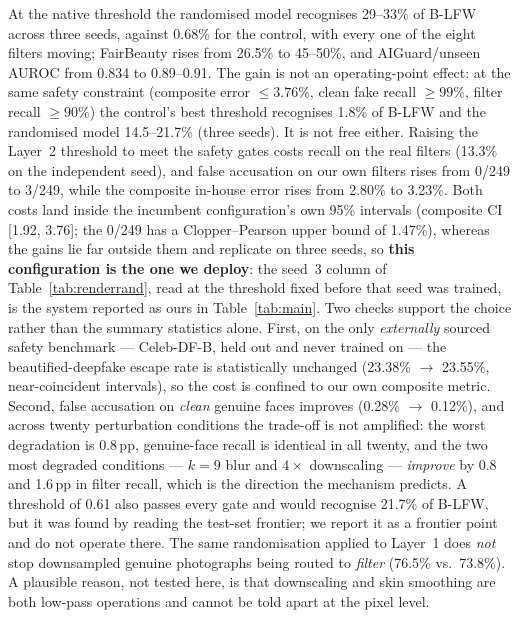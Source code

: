 \documentclass[conference]{IEEEtran}
\begin{document}
At the native threshold the randomised model recognises 29--33\% of B-LFW across three seeds, against
0.68\% for the control, with every one of the eight filters moving; FairBeauty rises from 26.5\% to
45--50\%, and AIGuard/unseen AUROC from 0.834 to 0.89--0.91. The gain is not an operating-point effect: at
the same safety constraint (composite error $\le 3.76\%$, clean fake recall $\ge 99\%$, filter recall
$\ge 90\%$) the control's best threshold recognises 1.8\% of B-LFW and the randomised model 14.5--21.7\% (three seeds).
It is not free either. Raising the Layer~2 threshold to meet the safety gates costs recall on the real
filters (13.3\% on the independent seed), and false accusation on our own filters rises from 0/249 to
3/249, while the composite in-house error rises from 2.80\% to 3.23\%. Both costs land inside the
incumbent configuration's own 95\% intervals (composite CI [1.92, 3.76]; the 0/249 has a
Clopper--Pearson upper bound of 1.47\%), whereas the gains lie far outside them and replicate on three
seeds, so \textbf{this configuration is the one we deploy}: the seed~3 column of
Table~\ref{tab:renderrand}, read at the threshold fixed before that seed was trained, is the system
reported as ours in Table~\ref{tab:main}. Two checks support the choice rather than the summary
statistics alone. First, on the only \emph{externally} sourced safety benchmark --- Celeb-DF-B, held
out and never trained on --- the beautified-deepfake escape rate is statistically unchanged
(23.38\% $\to$ 23.55\%, near-coincident intervals), so the cost is confined to our own composite
metric. Second, false accusation on \emph{clean} genuine faces improves (0.28\% $\to$ 0.12\%), and
across twenty perturbation conditions the trade-off is not amplified: the worst degradation is
0.8\,pp, genuine-face recall is identical in all twenty, and the two most degraded conditions ---
$k{=}9$ blur and $4\times$ downscaling --- \emph{improve} by 0.8 and 1.6\,pp in filter recall, which is
the direction the mechanism predicts.
A threshold of 0.61 also passes every gate and would recognise 21.7\% of B-LFW, but it was found by
reading the test-set frontier; we report it as a frontier point and do not operate there. The same randomisation applied to Layer~1 does \emph{not} stop downsampled genuine
photographs being routed to \emph{filter} (76.5\% vs.\ 73.8\%). A plausible reason, not tested here, is
that downscaling and skin smoothing are both low-pass operations and cannot be told apart at the pixel
level.
\end{document}
